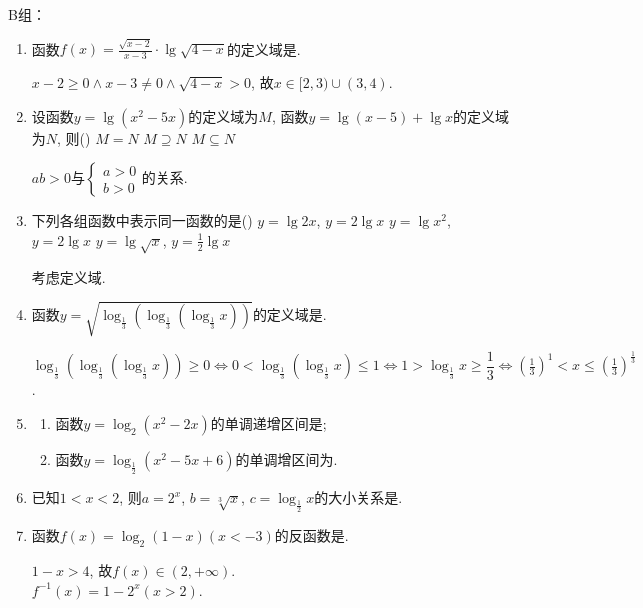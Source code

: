 B组：
\begin{enumerate}
\item 函数$f(x)=\frac{\sqrt{x-2}}{x-3}\cdot\lg\sqrt{4-x}$的定义域是\blkda[3]{$[2,3)\cup(3,4)$}. 
\begin{jieda}
$x-2\geq 0\land x-3\neq 0\land \sqrt{4-x}>0$, 故$x\in[2,3)\cup(3,4)$. 
\end{jieda}


\item 设函数$y=\lg(x^2-5x)$的定义域为$M$, 函数$y=\lg(x-5)+\lg{x}$的定义域为$N$, 则\dotfill()
{$M=N$}
{$M\supseteq N$}
{$M\subseteq N$}
\begin{jieda}
$ab>0$与$\begin{cases}
a>0\\
b>0
\end{cases}$的关系. 
\end{jieda}


\item 下列各组函数中表示同一函数的是\dotfill()
{$y=\lg2x$, $y=2\lg{x}$}
{$y=\lg{x^2}$, $y=2\lg{x}$}
{$y=\lg\sqrt{x}$, $y=\frac{1}{2}\lg{x}$}
\begin{jieda}
考虑定义域. 
\end{jieda}


\item 函数$y=\sqrt{\log_{\frac{1}{3}}\left(\log_{\frac{1}{3}}\left(\log_{\frac{1}{3}}x\right)\right)}$的定义域是\blkda{$\left(\frac{1}{3},\sqrt[3]{\frac{1}{3}}\right]$}.
\begin{jieda}
$\log_{\frac{1}{3}}\left(\log_{\frac{1}{3}}\left(\log_{\frac{1}{3}}x\right)\right)\geq 0\iff 0<\log_{\frac{1}{3}}\left(\log_{\frac{1}{3}}x\right)\leq 1
\iff 1>\log_{\frac{1}{3}}x\geq\dfrac{1}{3}\iff (\frac{1}{3})^1<x\leq(\frac{1}{3})^{\frac{1}{3}}$. 
\end{jieda}


\item 
\begin{enumerate}[(1)]
\item 函数$y=\log_2\left(x^2-2x\right)$的单调递增区间是; 
\item 函数$y=\log_{\frac{1}{2}}(x^2-5x+6)$的单调增区间为. 
\end{enumerate}


\item 已知$1<x<2$, 则$a=2^x$, $b=\sqrt[3]{x}$, $c=\log_{\frac{1}{2}}x$的大小关系是. 


\item 函数$f(x)=\log_2(1-x)(x<-3)$的反函数是.  
\begin{jieda}
$1-x>4$, 故$f(x)\in(2,+\infty)$. \\
$f^{-1}(x)=1-2^x(x>2)$. 
\end{jieda}



\end{enumerate}
